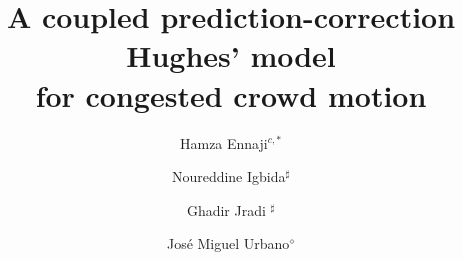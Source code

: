 \documentclass[final,reqno]{amsart}
\theoremstyle{plain}
\theoremstyle{definition}
\theoremstyle{remark}
\numberwithin{remark}{section}	%
\numberwithin{example}{section}	%
\begin{document}
 

\title[A prediction-correction Hughes' model]{A coupled prediction-correction Hughes' model\\ for congested crowd motion}

\author
[H.~Ennaji]
{Hamza Ennaji$^{c,\ast}$}
\address{$^{c}$\,%
Corresponding author.}
\address{$^{\ast}$\,%
Univ. Grenoble Alpes, CNRS, Grenoble INP*, LJK, 38000 Grenoble, France.}
\author
[N.~Igbida]
{Noureddine Igbida$^{\sharp}$}
\address{$^{\sharp}$\,%
Institut de recherche XLIM, UMR-CNRS 7252, Faculté des Sciences et Techniques, Université de Limoges, 87100 Limoges, France.}

\author
[G.~Jradi]
{Ghadir Jradi $^{\sharp}$}

\author[J.M. Urbano]{Jos\'{e} Miguel Urbano$^{\diamond}$}
\address{$^{\diamond}$\,Applied Mathematics and Computational Sciences (AMCS), Computer, Electrical and Mathematical Sciences and Engineering Division (CEMSE), King Abdullah University of Science and Technology (KAUST), Thuwal, 23955-6900, Kingdom of Saudi Arabia and CMUC, Department of Mathematics, University of Coimbra, 3000-143 Coimbra, Portugal.}






\end{document}

